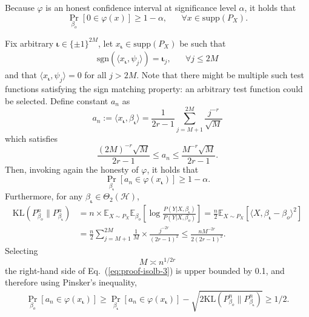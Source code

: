 \documentclass[11pt,a4paper]{article}
\newcommand{\vct}{\boldsymbol}
\theoremstyle{definition}
\theoremstyle{plain}
\theoremstyle{remark}
\newcommand{\supp}{\mathrm{supp}}
\newcommand{\mH}{\mathcal H}
\newcommand{\sgn}{\mathrm{sgn}}
\begin{document}
Because $\varphi$ is an honest confidence interval at significance level $\alpha$, it holds that 
\begin{equation}
\Pr_{\beta_o}\left[0\in\varphi(x)\right] \geq 1-\alpha,\;\;\;\;\;\;\forall x\in\supp(P_X).
\label{eq:proof-isolb-1}
\end{equation}

Fix arbitrary $\vct\iota\in\{\pm 1\}^{2M}$, let $x_{\vct\iota}\in\supp(P_X)$ be such that 
\begin{align}
\sgn(\langle x_{\vct\iota},\psi_j\rangle)=\vct\iota_j,\;\;\;\;\;\;\forall j\leq 2M\label{eq:proof-isolb-xl}
\end{align}
and that $\langle x_{\vct\iota},\psi_j\rangle = 0$ for all $j>2M$.
Note that there might be multiple such test functions satisfying the sign matching property: an arbitrary test function could be selected.
Define constant $a_n$ as
$$
a_n := \langle x_{\vct\iota},\beta_{\vct\iota}\rangle = \frac{1}{2r-1}\sum_{j=M+1}^{2M}\frac{j^{-r}}{\sqrt{M}}
$$
which satisfies
\begin{equation}
\frac{(2M)^{-r}\sqrt{M}}{2r-1} \leq a_n \leq \frac{M^{-r}\sqrt{M}}{2r-1}.
\label{eq:proof-isolb-1half}
\end{equation}
Then, invoking again the honesty of $\varphi$, it holds that
\begin{equation}
\Pr_{\beta_{\vct\iota}}\left[a_n\in\varphi(x_{\vct\iota})\right] \geq 1-\alpha.
\label{eq:proof-isolb-2}
\end{equation}
Furthermore, for any $\beta_{\vct\iota}\in\Theta_2(\mH)$, 
\begin{align}
\mathrm{KL}(P_{\beta_o}^n\|P_{\beta_{\vct\iota}}^n) &= n\times \mathbb E_{X\sim P_X}\mathbb E_{\beta_o}\left[\log\frac{P(Y|X,\beta_{\vct\iota})}{P(Y|X,\beta_o)}\right]
= \frac{n}{2}\mathbb E_{X\sim P_X}[\langle X, \beta_{\vct\iota}-\beta_o\rangle^2]\nonumber\\
&= \frac{n}{2}\sum_{j=M+1}^{2M} \frac{1}{M}\times \frac{j^{-2r}}{(2r-1)^2} \leq \frac{nM^{-2r}}{2(2r-1)^2}.\label{eq:proof-isolb-3}
\end{align}
Selecting 
$$
M\asymp n^{1/2r}
$$
the right-hand side of Eq.~(\ref{eq:proof-isolb-3}) is upper bounded by 0.1, and therefore using Pinsker's inequality,
\begin{align}
{\Pr_{\beta_o}[a_n\in\varphi(x_{\vct\iota})]\geq \Pr_{\beta_{\vct\iota}}[a_n\in\varphi(x_{\vct\iota})] - \sqrt{2\mathrm{KL}(P_{\beta_o}^n\|P_{\beta_{\vct\iota}}^n)} \geq 1/2.}
\label{eq:proof-isolb-4}
\end{align}
\end{document}
